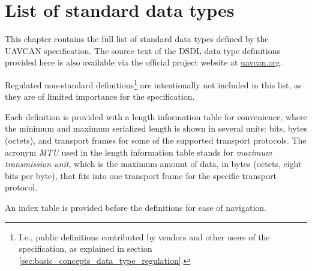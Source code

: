 \chapter{List of standard data types}

This chapter contains the full list of standard data types defined by the UAVCAN specification.
The source text of the DSDL data type definitions provided here is also available via the
official project website at \href{http://uavcan.org}{uavcan.org}.

Regulated non-standard definitions\footnote{I.e., public definitions contributed by vendors and other users
of the specification, as explained in section \ref{sec:basic_concepts_data_type_regulation}.}
are intentionally not included in this list, as they are of limited importance for the specification.

Each definition is provided with a length information table for convenience,
where the minimum and maximum serialized length is shown in several units:
bits, bytes (octets), and transport frames for some of the supported transport protocols.
The acronym \emph{MTU} used in the length information table stands for
\emph{maximum transmission unit}, which is the maximum amount of data, in bytes (octets, eight bits per byte),
that fits into one transport frame for the specific transport protocol.

An index table is provided before the definitions for ease of navigation.

\clearpage{}
